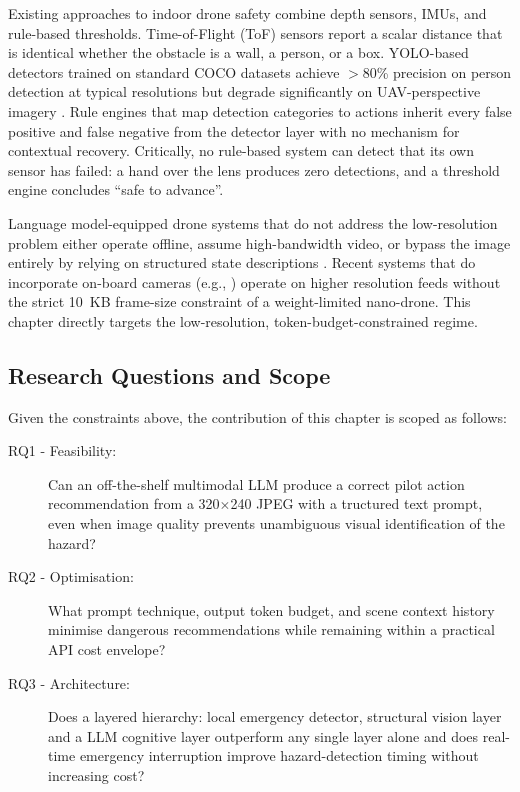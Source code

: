 Existing approaches to indoor drone safety combine depth sensors, IMUs, and rule-based thresholds. 
Time-of-Flight (ToF) sensors report a scalar distance that is identical whether the obstacle is a wall, a person, or a box.
YOLO-based detectors trained on standard COCO datasets achieve $>$80\% precision on person detection at typical resolutions but degrade significantly on UAV-perspective imagery \cite{persondetectionuav2025,kim2024yoloihd}. 
Rule engines that map detection categories to actions inherit every false positive and false negative from the detector layer with no mechanism for contextual recovery. 
Critically, no rule-based system can detect that its own sensor has
failed: a hand over the lens produces zero detections, and a threshold engine concludes ``safe to advance''.

Language model-equipped drone systems that do not address the low-resolution problem either operate offline, assume high-bandwidth video, or bypass the image entirely by relying on structured state descriptions \cite{ahn2022saycan, huang2022innermonologue}. 
Recent systems that do incorporate on-board cameras (e.g., \cite{rescuedrone2025, hierarchicaldrone2025}) operate on higher
resolution feeds without the strict 10~KB frame-size constraint of a
weight-limited nano-drone. 
This chapter directly targets the low-resolution, token-budget-constrained regime.
\newpage
\subsection{Research Questions and Scope}
\label{sec:ch2_problem_rq}

Given the constraints above, the contribution of this chapter is scoped as follows:

\begin{description}
  \item[RQ1 - Feasibility:] Can an off-the-shelf multimodal LLM produce a correct pilot action recommendation from a 320$\times$240 JPEG with a tructured text prompt, even when image quality prevents unambiguous visual identification of the hazard?
  \item[RQ2 - Optimisation:] What prompt technique, output token budget, and scene context history minimise dangerous recommendations while remaining within a practical API cost envelope?
  \item[RQ3 - Architecture:] Does a layered hierarchy: local emergency detector, structural vision layer and a LLM cognitive layer outperform any single layer alone and does real-time emergency interruption improve hazard-detection timing without increasing cost?
\end{description}


